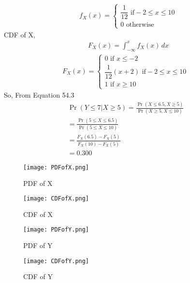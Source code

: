 \documentclass[journal,12pt,twocolumn]{IEEEtran}
\begin{document}
\begin{align}
\tag{54.4}
 &f_X(x)=\begin{cases}
  \dfrac{1}{12}  \text{  if} -2\leq x \leq10\\
    0 \text{  otherwise}
  \end{cases}
\end{align}
CDF of X,
\begin{align*}
    &F_X(x)=\int_{-\infty}^{x}f_X(x)\,dx
\end{align*}
\begin{align}
\tag{54.5}
  F_X(x)=\begin{cases}
  0  \text{ if } x\leq-2\\
  \dfrac{1}{12}(x+2) \text{ if} -2\leq x \leq 10\\
  1 \text{  if }  x \geq 10
  \end{cases}
\end{align}
So,  From Equation 54.3
\begin{align}
\tag{54.6}
\Pr(Y\leq7|X\geq5)=\frac{\Pr(X\leq6.5,X\geq5)}{\Pr(X\geq5,X\leq10)}\\
\tag{54.7}
=\frac{\Pr(5\leq X\leq6.5)}{\Pr(5 \leq X\leq10)}\\
\tag{54.8}
=\frac{F_X(6.5)-F_X(5)}{F_X(10)-F_X(5)}\\
\tag{54.9}
=0.300
\end{align}
\begin{figure}[h]
    \centering
    \texttt{[image: PDFofX.png]}
    \caption{PDF of X}
    \label{fig:my_label}
\end{figure}
\begin{figure}[h]
    \centering
    \texttt{[image: CDFofX.png]}
    \caption{CDF of X}
    \label{fig:my_label}
\end{figure}

\begin{figure}[h]
    \centering
    \texttt{[image: PDFofY.png]}
    \caption{PDF of Y}
    \label{fig:my_label}
\end{figure}

\begin{figure}[h]
    \centering
    \texttt{[image: CDFofY.png]}
    \caption{CDF of Y}
    \label{fig:my_label}
\end{figure}
\end{document}
